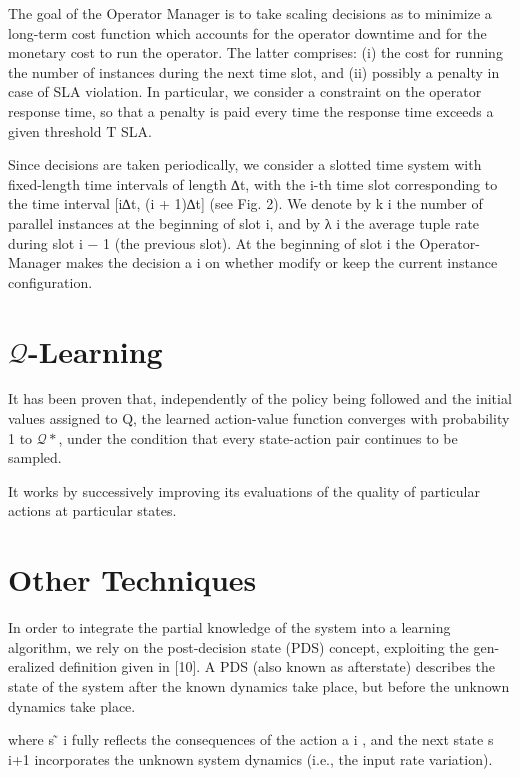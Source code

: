 The goal of the Operator Manager is to take scaling decisions as to minimize
a long-term cost function which accounts for the operator downtime and for the
monetary cost to run the operator. The latter comprises: (i) the cost for running
the number of instances during the next time slot, and (ii) possibly a penalty
in case of SLA violation. In particular, we consider a constraint on the operator
response time, so that a penalty is paid every time the response time exceeds a
given threshold T SLA.

Since decisions are taken periodically, we consider a slotted time system with
fixed-length time intervals of length ∆t, with the i-th time slot corresponding
to the time interval [i∆t, (i + 1)∆t] (see Fig. 2). We denote by k i the number
of parallel instances at the beginning of slot i, and by λ i the average tuple rate
during slot i − 1 (the previous slot). At the beginning of slot i the Operator-
Manager makes the decision a i on whether modify or keep the current instance
configuration.


\section{$\mathcal{Q}$-Learning}
\label{sec:reinforcement-learning-q-learning}

It has been proven that, independently of the policy being followed and the initial values assigned to Q, the learned action-value function converges with probability 1 to $\mathcal{Q}*$\cite{watkins1992q}, under the condition that every state-action pair continues to be sampled.

It works by successively improving its evaluations of the quality of particular actions at particular states.


\section{Other Techniques}
\label{reinforcement-learning-other-techniques}

In order to integrate the partial knowledge of the system into a learning
algorithm, we rely on the post-decision state (PDS) concept, exploiting the gen-
eralized definition given in [10]. A PDS (also known as afterstate) describes the
state of the system after the known dynamics take place, but before the unknown
dynamics take place. 

where s  ̃ i fully reflects the consequences of the action a i , and the next state s i+1
incorporates the unknown system dynamics (i.e., the input rate variation).

